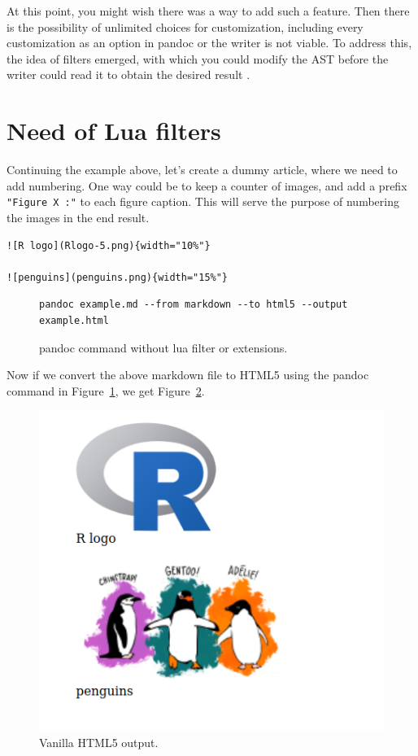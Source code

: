 At this point, you might wish there was a way to add such a feature. Then there is the possibility of unlimited choices for customization, including every customization as an option in pandoc or the writer is not viable. 
To address this, the idea of filters emerged, with which you could modify the AST before the writer could read it to obtain the desired result \citep{pandocfilters}.

\section{Need of Lua filters}

Continuing the example above, let's create a dummy article, where we need to add
numbering. One way could be to keep a counter of images, and add a prefix \verb|"Figure X :"|
to each figure caption. This will serve the purpose of numbering the images in the end result.

\begin{verbatim}
![R logo](Rlogo-5.png){width="10%"}

![penguins](penguins.png){width="15%"}

\end{verbatim}

\begin{figure}[htbp]
\begin{verbatim}
pandoc example.md --from markdown --to html5 --output example.html
\end{verbatim}
\caption{pandoc command without lua filter or extensions.}
\label{code:2}
\end{figure}

Now if we convert the above markdown file to HTML5 using the pandoc command in Figure~\ref{code:2}, we get Figure~\ref{fig:1}.


\begin{figure}[!htbp]
\centering
\includegraphics[width=0.5\linewidth]{figures/example.png}
\caption{Vanilla HTML5 output.}
\label{fig:1}
\end{figure}

